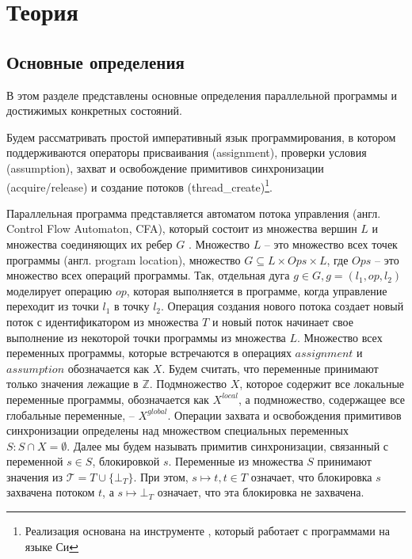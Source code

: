 \newcommand{\epp}{\mathrel{\bigoplus}}

\chapter{Теория}
\label{chapter_theory}

\section{Основные определения}
В этом разделе представлены основные определения параллельной программы и достижимых конкретных состояний.

Будем рассматривать простой императивный язык программирования, в котором поддерживаются операторы присваивания (assignment), проверки условия (assumption), захват и освобождение примитивов синхронизации (acquire/release) и создание потоков (thread\_create)\footnote{Реализация основана на инструменте \cpachecker, который работает с программами на языке Си}.

Параллельная программа представляется автоматом потока управления (англ. Control Flow Automaton, CFA), который состоит из множества вершин $L$  и множества соединяющих их ребер $G$ .
Множество $L$ -- это множество всех точек программы (англ. program location), множество $G \subseteq L \times Ops \times L$, где $Ops$ -- это множество всех операций программы.
Так, отдельная дуга $g \in G, g = (l_1, op, l_2)$ моделирует операцию $op$, которая выполняется в программе, когда управление переходит из точки $l_1$ в точку $l_2$.
Операция создания нового потока создает новый поток с идентификатором из множества $T$ и новый поток начинает свое выполнение из некоторой точки программы из множества $L$.
Множество всех переменных программы, которые встречаются в операциях $assignment$ и $assumption$ обозначается как $X$.
Будем считать, что переменные принимают только значения лежащие в $\mathbb{Z}$.
Подмножество $X$, которое содержит все локальные переменные программы, обозначается как $X^{local}$, а подмножество, содержащее все глобальные переменные, --  $X^{global}$. 
Операции захвата и освобождения примитивов синхронизации определены над множеством специальных переменных $S: S \cap X = \emptyset$.
Далее мы будем называть примитив синхронизации, связанный с переменной $s \in S$, блокировкой $s$.
Переменные из множества $S$ принимают значения из $\mathcal{T}=T \cup \{\bot_T\}$.
При этом, $s \mapsto t, t \in T$ означает, что блокировка $s$ захвачена потоком $t$, а $s \mapsto \bot_T$ означает, что эта блокировка не захвачена.

